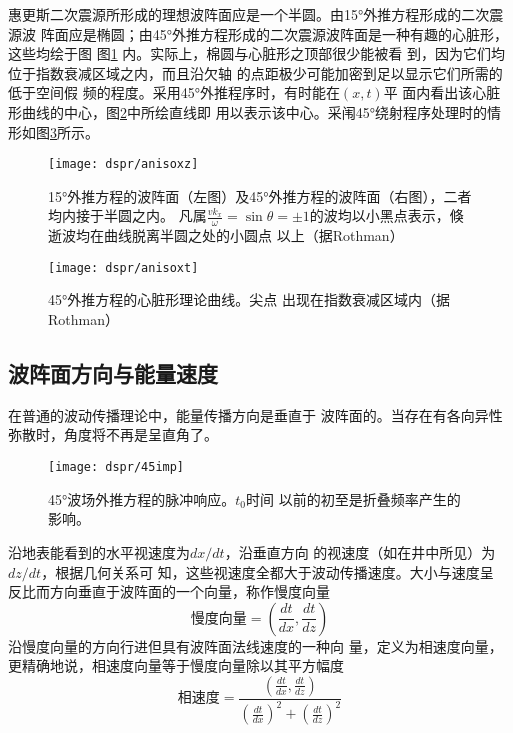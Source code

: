 惠更斯二次震源所形成的理想波阵面应是一个半圆。由15°外推方程形成的二次震源波
阵面应是椭圆；由45°外推方程形成的二次震源波阵面是一种有趣的心脏形，这些均绘于图
图\ref{fig:dspr/anisoxz}
内。实际上，棉圆与心脏形之顶部很少能被看
到，因为它们均位于指数衰减区域之内，而且沿欠轴
的点距极少可能加密到足以显示它们所需的低于空间假
频的程度。采用45°外推程序时，有时能在$(x,t)$平
面内看出该心脏形曲线的中心，图\ref{fig:dspr/anisoxt}中所绘直线即
用以表示该中心。采闱45°绕射程序处理时的情形如图\ref{fig:dspr/45imp}所示。

\begin{figure}[H]
\centering
\texttt{[image: dspr/anisoxz]}
\caption[anisoxz]{15°外推方程的波阵面（左图）及45°外推方程的波阵面（右图），二者均内接于半圆之内。
凡属$\frac{vk_x}{\omega}=\sin\theta=\pm1$的波均以小黑点表示，倏逝波均在曲线脱离半圆之处的小圆点
以上（据Rothman）}
\label{fig:dspr/anisoxz}
\end{figure}

\begin{figure}[H]
\centering
\texttt{[image: dspr/anisoxt]}
\caption[anisoxt]{45°外推方程的心脏形理论曲线。尖点
出现在指数衰减区域内（据Rothman）}
\label{fig:dspr/anisoxt}
\end{figure}

\subsection{波阵面方向与能量速度}
\label{sec:4.2.2}

在普通的波动传播理论中，能量传播方向是垂直于
波阵面的。当存在有各向异性弥散时，角度将不再是呈直角了。

\begin{figure}[H]
\centering
\texttt{[image: dspr/45imp]}
\caption[45imp]{45°波场外推方程的脉冲响应。$t_0$时间
以前的初至是折叠频率产生的影响。}
\label{fig:dspr/45imp}
\end{figure}

沿地表能看到的水平视速度为$dx/dt$，沿垂直方向
的视速度（如在井中所见）为$dz/dt$，根据几何关系可
知，这些视速度全都大于波动传播速度。大小与速度呈
反比而方向垂直于波阵面的一个向量，称作慢度向量
\begin{equation*}
\text{慢度向量}=(\frac{dt}{dx},\frac{dt}{dz})
\end{equation*}
沿慢度向量的方向行进但具有波阵面法线速度的一种向
量，定义为相速度向量，更精确地说，相速度向量等于慢度向量除以其平方幅度
\begin{equation*}
\text{相速度}=\frac{(\frac{dt}{dx},\frac{dt}{dz})}{(\frac{dt}{dx})^2+(\frac{dt}{dz})^2}
\end{equation*}

